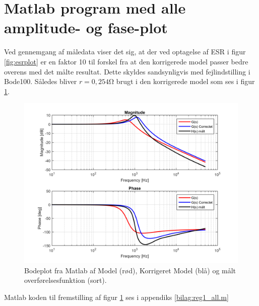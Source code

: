 \section{Matlab program med alle amplitude- og fase-plot}\label{sec:spm5}

Ved gennemgang af måledata viser det sig, at der ved optagelse af ESR i figur \ref{fig:esrplot} er en faktor 10 til forskel fra at den korrigerede model passer bedre overens med det målte resultat.
Dette skyldes sandsynligvis med fejlindstilling i Bode100. 
Således bliver $r = 0,254 \si{\ohm}$ brugt i den korrigerede model som ses i figur \ref{fig:bodeplot_all}. 

\begin{figure}[h!]
	\centering
	\includegraphics[width=.8\textwidth]{bodeplot_all.png}
	\caption{Bodeplot fra Matlab af Model (rød), Korrigeret Model (blå) og målt overførelsesfunktion (sort).}
	\label{fig:bodeplot_all}
\end{figure}
\FloatBlock

Matlab koden til fremstilling af figur \ref{fig:bodeplot_all} ses i appendiks \ref{bilag:reg1_all.m}